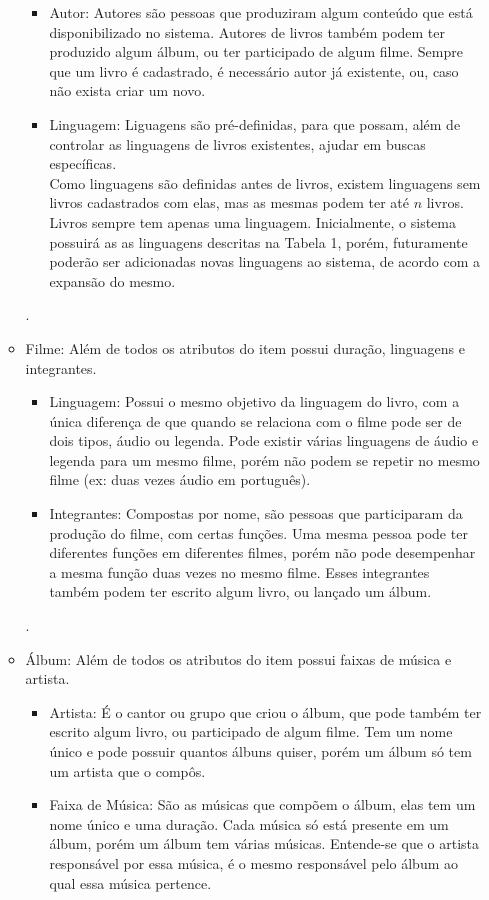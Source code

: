 \documentclass[a4paper, 11pt]{article}
\begin{document}
\begin{itemize}
\begin{itemize}
\begin{itemize}
            \item Autor: Autores são pessoas que produziram algum conteúdo que está disponibilizado no sistema. Autores de livros também podem ter produzido algum álbum, ou ter participado de algum filme. Sempre que um livro é cadastrado, é necessário autor já existente, ou, caso não exista criar um novo.\\
            \item Linguagem: Liguagens são pré-definidas, para que possam, além de controlar as linguagens de livros existentes, ajudar em buscas específicas.\\
            Como linguagens são definidas antes de livros, existem linguagens sem livros cadastrados com elas, mas as mesmas podem ter até $n$ livros. Livros sempre tem apenas uma linguagem. Inicialmente, o sistema possuirá as as linguagens descritas na Tabela 1, porém, futuramente poderão ser adicionadas novas linguagens ao sistema, de acordo com a expansão do mesmo.
        \end{itemize}.
        \item Filme: Além de todos os atributos do item possui duração, linguagens e integrantes.
        \begin{itemize}
            \item Linguagem: Possui o mesmo objetivo da linguagem do livro, com a única diferença de que quando se relaciona com o filme pode ser de dois tipos, áudio ou legenda. Pode existir várias linguagens de áudio e legenda para um mesmo filme, porém não podem se repetir no mesmo filme (ex: duas vezes áudio em português).
            \item Integrantes: Compostas por nome, são pessoas que participaram da produção do filme, com certas funções. Uma mesma pessoa pode ter diferentes funções em diferentes filmes, porém não pode desempenhar a mesma função duas vezes no mesmo filme. Esses integrantes também podem ter escrito algum livro, ou lançado um álbum.
        \end{itemize}.
        \item Álbum: Além de todos os atributos do item possui faixas de música e artista.
        \begin{itemize}
            \item Artista: É o cantor ou grupo que criou o álbum, que pode também ter escrito algum livro, ou participado de algum filme. Tem um nome único e pode possuir quantos álbuns quiser, porém um álbum só tem um artista que o compôs.
            \item Faixa de Música: São as músicas que compõem o álbum, elas tem um nome único e uma duração. Cada música só está presente em um álbum, porém um álbum tem várias músicas. Entende-se que o artista responsável por essa música, é o mesmo responsável pelo álbum ao qual essa música pertence.

\end{itemize}
\end{itemize}
\end{itemize}
\end{document}
